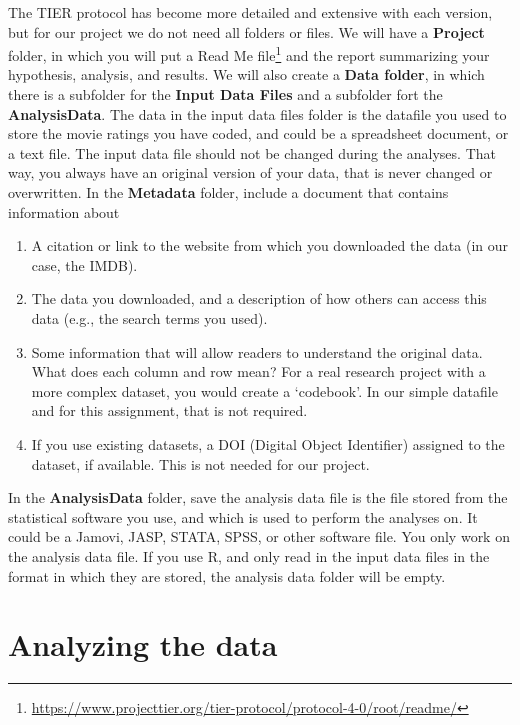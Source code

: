 \documentclass[
  oneside]{krantz}
\renewcommand{\href}[2]{#2\footnote{\url{#1}}}
\begin{document}
The TIER protocol has become more detailed and extensive with each version, but for our project we do not need all folders or files. We will have a \textbf{Project} folder, in which you will put a \href{https://www.projecttier.org/tier-protocol/protocol-4-0/root/readme/}{Read Me file} and the report summarizing your hypothesis, analysis, and results. We will also create a \textbf{Data folder}, in which there is a subfolder for the \textbf{Input Data Files} and a subfolder fort the \textbf{AnalysisData}. The data in the input data files folder is the datafile you used to store the movie ratings you have coded, and could be a spreadsheet document, or a text file. The input data file should not be changed during the analyses. That way, you always have an original version of your data, that is never changed or overwritten. In the \textbf{Metadata} folder, include a document that contains information about

\begin{enumerate}
\def\labelenumi{\arabic{enumi}.}
\item
  A citation or link to the website from which you downloaded the data (in our case, the IMDB).
\item
  The data you downloaded, and a description of how others can access this data (e.g., the search terms you used).
\item
  Some information that will allow readers to understand the original data. What does each column and row mean? For a real research project with a more complex dataset, you would create a `codebook'. In our simple datafile and for this assignment, that is not required.
\item
  If you use existing datasets, a DOI (Digital Object Identifier) assigned to the dataset, if available. This is not needed for our project.
\end{enumerate}

In the \textbf{AnalysisData} folder, save the analysis data file is the file stored from the statistical software you use, and which is used to perform the analyses on. It could be a Jamovi, JASP, STATA, SPSS, or other software file. You only work on the analysis data file. If you use R, and only read in the input data files in the format in which they are stored, the analysis data folder will be empty.

\hypertarget{analyzing-the-data}{%
\section{Analyzing the data}\label{analyzing-the-data}}
\end{document}
